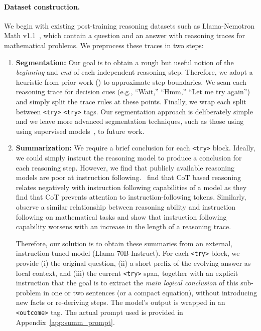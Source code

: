 \documentclass{article}
\newcommand{\BK}[1]{{\color{cyan}[BK: #1]}}
\begin{document}
\paragraph{Dataset construction.}\label{subsec:dataset_construction}  

We begin with existing post-training reasoning datasets such as Llama-Nemotron Math v1.1~\cite{bercovich2025llama}, which contain a question and an answer with reasoning traces for mathematical problems. We preprocess these traces in two steps:
\begin{enumerate}[leftmargin=*]
\item \textbf{Segmentation:}
Our goal is to obtain a rough but useful notion of the \emph{beginning} and \emph{end} of each independent reasoning step. Therefore, we adopt a heuristic from prior work (\citet{qu2025optimizing}) to approximate step boundaries. We scan each reasoning trace for decision cues (e.g., “Wait,” “Hmm,” “Let me try again”) and simply split the trace rules at these points. Finally, we wrap each split between \texttt{<try>} \texttt{<try>} tags. Our segmentation approach is deliberately simple and we leave more advanced segmentation techniques, such as those using using supervised models~\citep{somasundaran2020two}, to future work.  

\item \textbf{Summarization:} We require a brief conclusion for each \texttt{<try>} block. Ideally, we could simply instruct the reasoning model to produce a conclusion for each reasoning step. However, we find that publicly available reasoning models are poor at instruction following.~\citet{li2025thinking} find that CoT based reasoning relates negatively with instruction following capabilities of a model as they find that CoT prevents attention to instruction-following tokens. Similarly,~\citet{fu2025scaling} observe a similar relationship between reasoning ability and instruction following on mathematical tasks and show that instruction following capability worsens with an increase in the length of a reasoning trace. 

Therefore, our solution is to obtain these summaries from an  external, instruction-tuned model (Llama-70B-Instruct). For each \texttt{<try>} block, we provide (i) the original question, (ii) a short prefix of the evolving answer as local context, and (iii) the current \texttt{<try>} span, together with an explicit instruction that the goal is to extract the \emph{main logical conclusion} of this sub-problem in one or two sentences (or a compact equation), without introducing new facts or re-deriving steps. The model’s output is wrapped in an \texttt{<outcome>} tag. The actual prompt used is provided in Appendix~\ref{app:summ_prompt}.
\end{enumerate}
\end{document}

